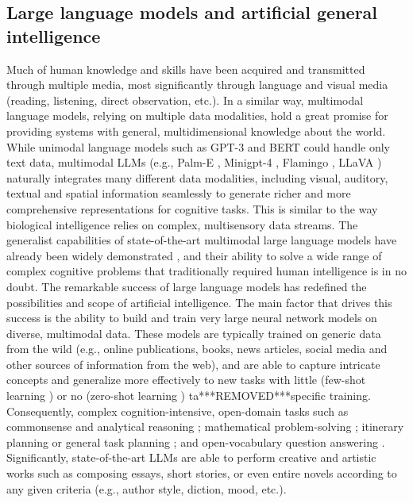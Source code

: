 \documentclass[10pt,journal,compsoc]{IEEEtran}
\begin{document}
	\subsection{Large language models and artificial general intelligence}
	Much of human knowledge and skills have been acquired and transmitted through multiple media, most significantly through language and visual media (reading, listening, direct observation, etc.). In a similar way, multimodal language models, relying on multiple data modalities, hold a great promise for providing systems with general, multidimensional knowledge about the world. While unimodal language models such as GPT-3 \cite{floridi2020gpt} and BERT \cite{kenton2019bert} could handle only text data, multimodal LLMs (e.g., Palm-E \cite{driess2023palm}, Minigpt-4 \cite{zhu2023minigpt}, Flamingo \cite{alayrac2022flamingo}, LLaVA \cite{liu2024visual}) naturally integrates many different data modalities, including visual, auditory, textual and spatial information seamlessly to generate richer and more comprehensive representations for cognitive tasks. This is similar to the way biological intelligence relies on complex, multisensory data streams. 
	The generalist capabilities of state-of-the-art multimodal large language models have already been widely demonstrated \cite{bubeck2023sparks,ilic2024evidence}, and their ability to solve a wide range of complex cognitive problems that traditionally required human intelligence is in no doubt. The remarkable success of large language models has redefined the possibilities and scope of artificial intelligence. The main factor that drives this success is the ability to build and train very large neural network models on diverse, multimodal data. These models are typically trained on generic data from the wild (e.g., online publications, books, news articles, social media and other sources of information from the web), and are able to capture intricate concepts and generalize more effectively to new tasks with little (few-shot learning \cite{gao2020making,liu2023large}) or no (zero-shot learning \cite{kojima2022large}) ta***REMOVED***specific training. Consequently, complex cognition-intensive, open-domain tasks such as commonsense and analytical reasoning \cite{yin2024survey,krause2024data}; mathematical problem-solving \cite{ahn2024large,imani2023mathprompter}; itinerary planning \cite{tang2024synergizing,kanhed2024destinai} or general task planning \cite{shen2024hugginggpt}; and open-vocabulary question answering \cite{cheng2024efficienteqa,majumdar2024openeqa}. Significantly, state-of-the-art LLMs are able to perform creative and artistic works such as composing essays, short stories, or even entire novels \cite{yuan2022wordcraft,franceschelli2024creativity} according to any given criteria (e.g., author style, diction, mood, etc.). 
	
\end{document}
